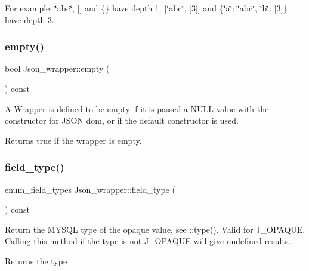 For example\+: \char`\"{}abc\char`\"{}, \mbox{[}\mbox{]} and \{\} have depth 1. \mbox{[}\char`\"{}abc\char`\"{}, \mbox{[}3\mbox{]}\mbox{]} and \{\char`\"{}a\char`\"{}\+: \char`\"{}abc\char`\"{}, \char`\"{}b\char`\"{}\+: \mbox{[}3\mbox{]}\} have depth 3. \mbox{\label{classJson__wrapper_ad8cd446ff3805d95f97a5f5c5e8ca47f}} 
\subsubsection{\texorpdfstring{empty()}{empty()}}
{\footnotesize\ttfamily bool Json\+\_\+wrapper\+::empty (\begin{DoxyParamCaption}{ }\end{DoxyParamCaption}) const\hspace{0.3cm}{\ttfamily [inline]}}

A Wrapper is defined to be empty if it is passed a N\+U\+LL value with the constructor for J\+S\+ON dom, or if the default constructor is used.

\begin{DoxyReturn}{Returns}
true if the wrapper is empty. 
\end{DoxyReturn}
\mbox{\label{classJson__wrapper_a4235f2ce870d51034f491b087ec1646b}} 
\subsubsection{\texorpdfstring{field\+\_\+type()}{field\_type()}}
{\footnotesize\ttfamily enum\+\_\+field\+\_\+types Json\+\_\+wrapper\+::field\+\_\+type (\begin{DoxyParamCaption}{ }\end{DoxyParamCaption}) const}

Return the M\+Y\+S\+QL type of the opaque value, see \+::type(). Valid for J\+\_\+\+O\+P\+A\+Q\+UE. Calling this method if the type is not J\+\_\+\+O\+P\+A\+Q\+UE will give undefined results.

\begin{DoxyReturn}{Returns}
the type 
\end{DoxyReturn}
\mbox{\label{classJson__wrapper_a41d981986c3627b7f73b1ed3ebc9f5db}} 
